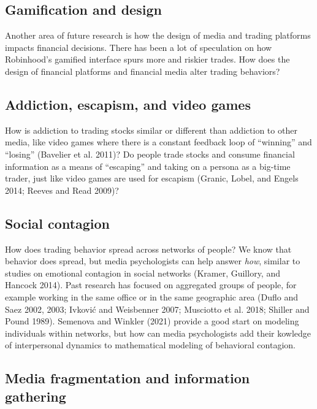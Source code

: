 \documentclass[12pt,]{article}
\begin{document}
\hypertarget{gamification-and-design}{%
\subsection{Gamification and design}\label{gamification-and-design}}

Another area of future research is how the design of media and trading
platforms impacts financial decisions. There has been a lot of
speculation on how Robinhood's gamified interface spurs more and riskier
trades. How does the design of financial platforms and financial media
alter trading behaviors?

\hypertarget{addiction-escapism-and-video-games}{%
\subsection{Addiction, escapism, and video
games}\label{addiction-escapism-and-video-games}}

How is addiction to trading stocks similar or different than addiction
to other media, like video games where there is a constant feedback loop
of ``winning'' and ``losing'' (Bavelier et al. 2011)? Do people trade
stocks and consume financial information as a means of ``escaping'' and
taking on a persona as a big-time trader, just like video games are used
for escapism (Granic, Lobel, and Engels 2014; Reeves and Read 2009)?

\hypertarget{social-contagion}{%
\subsection{Social contagion}\label{social-contagion}}

How does trading behavior spread across networks of people? We know that
behavior does spread, but media psychologists can help answer
\emph{how}, similar to studies on emotional contagion in social networks
(Kramer, Guillory, and Hancock 2014). Past research has focused on
aggregated groups of people, for example working in the same office or
in the same geographic area (Duflo and Saez 2002, 2003; Ivković and
Weisbenner 2007; Musciotto et al. 2018; Shiller and Pound 1989).
Semenova and Winkler (2021) provide a good start on modeling individuals
within networks, but how can media psychologists add their kowledge of
interpersonal dynamics to mathematical modeling of behavioral contagion.

\hypertarget{media-fragmentation-and-information-gathering}{%
\subsection{Media fragmentation and information
gathering}\label{media-fragmentation-and-information-gathering}}
\end{document}
